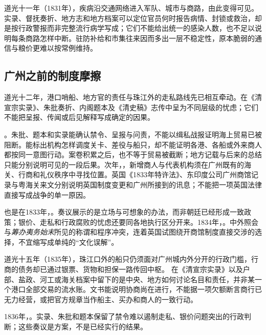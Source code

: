 道光十一年（1831年），疾病沿交通网络进入军队、城市与商路，由此变得可见。实录、督抚奏折、地方志和地方档案可以定位官员何时报告病情、封锁或救治，却是按行政警报而非完整流行病学写成；它们不能给出统一的感染人数，也不足以说明每条商路怎样中断。驻防补给和市集往来因而多出一层不稳定性，原本脆弱的通信与粮价更难以按常例维持。

\subsection{广州之前的制度摩擦}

道光十二年，港口哨船、地方官的责任与珠江外的走私路线先已相互牵动。在《清宣宗实录》、朱批奏折、内阁题本及《清史稿》志传中呈为不同层级的忧虑；它们不能把呈报、传闻或后见解释写成确定的因果。

。朱批、题本和实录能确认禁令、呈报与问责，不能以缉私战报证明海上贸易已被阻断。能标出机构怎样调度关卡、差役与船只，却不能证明各港、各船或外来商人都按同一意图行动。案卷积累之后，也不等于贸易被截断；地方记载与后来的总结只能分别说明可见的一段后果。次年，，新增商人与代表机构须在广州既有的海关、行商和礼仪秩序中寻找位置。英国《1833年特许法》、东印度公司广州商馆记录与粤海关来文分别说明英国制度变更和广州所接到的讯息；不能把一项英国法律直接写成战争的单一原因。

也是在1833年，。奏议展示的是立场与可想象的办法，而非朝廷已经形成一致政策；银价、走私和行政腐败的忧虑还要同各地执行区分开来。1834年，。中外照会与\textit{筹办夷务始末}所见的称谓和程序冲突，连着英国试图绕开商馆制度直接交涉的选择，不宜缩写成单纯的“文化误解”。

道光十五年（1835年），珠江口外的船只仍须面对广州城内外分开的行政门槛，行商的债务却已通过银票、货物和担保一路传回中枢。 在《清宣宗实录》以及户部、盐政、河工或海关档案中留下的是中央、地方如何讨论名目和责任，并非某一个港口全部交易的流水账。文书能说明协商尚在进行，不能据一项欠额断言商行已无力经营，或把官方规章当作船主、买办和商人的一致行动。

1836年，。实录、朱批和题本保留了禁令难以遏制走私、银价问题突出的行政判断；这些奏议是方案，不是已经实行的结果。

